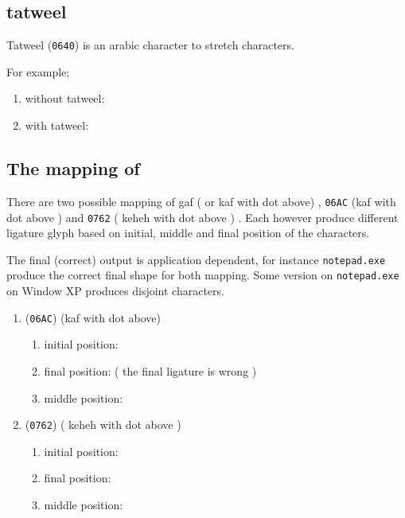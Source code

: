 \documentclass[12pt,a4paper]{IEEEconf}
\begin{document}
\subsection{tatweel}

Tatweel  (\verb|0640|) is an arabic character to stretch characters. 

For example;
\begin{enumerate}
\item without tatweel: 
\item with tatweel: 
\end{enumerate}


\subsection{The mapping of }
There are two possible mapping of gaf ( or kaf with dot above) , \verb|06AC| (kaf with dot above ) and \verb|0762| ( keheh with dot above ) \cite{patterns1991unicode,davis2008moving}. Each however produce different ligature glyph based on initial, middle and final position of the characters. \cite{dan1988daftar}

The final (correct) output is application dependent, for instance \verb|notepad.exe| produce the correct final shape for both mapping. Some version on \verb|notepad.exe| on Window XP produces disjoint characters.

\begin{enumerate}
\item {} (\verb|06AC|) (kaf with dot above)

 \begin{enumerate}
 \item initial position:  
 \item final position:  ( the final ligature is wrong )
 \item middle position: 
 \end{enumerate}



\item {} (\verb|0762|) ( keheh with dot above )
 
 \begin{enumerate}
 \item initial position: 
 \item final position: 
 \item middle position: 
 \end{enumerate}
\end{enumerate} 
\end{document}
